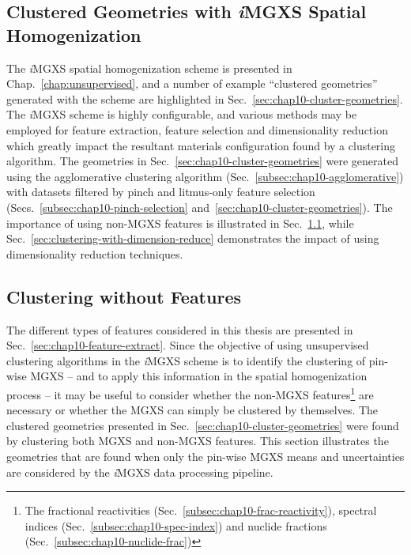 \begin{appendices}
\clearpage


\chapter{Clustered Geometries with \textit{i}MGXS Spatial Homogenization}
\label{sec:clustered-geometries}

The \textit{i}\ac{MGXS} spatial homogenization scheme is presented in Chap.~\ref{chap:unsupervised}, and a number of example ``clustered geometries'' generated with the scheme are highlighted in Sec.~\ref{sec:chap10-cluster-geometries}. The \textit{i}\ac{MGXS} scheme is highly configurable, and various methods may be employed for feature extraction, feature selection and dimensionality reduction which greatly impact the resultant materials configuration found by a clustering algorithm. The geometries in Sec.~\ref{sec:chap10-cluster-geometries} were generated using the agglomerative clustering algorithm (Sec.~\ref{subsec:chap10-agglomerative}) with datasets filtered by pinch and litmus-only feature selection (Secs.~\ref{subsec:chap10-pinch-selection} and~\ref{sec:chap10-cluster-geometries}). The importance of using non-\ac{MGXS} features is illustrated in Sec.~\ref{sec:clustering-without-features}, while Sec.~\ref{sec:clustering-with-dimension-reduce} demonstrates the impact of using dimensionality reduction techniques.


\section{Clustering without Features}
\label{sec:clustering-without-features}

The different types of features considered in this thesis are presented in Sec.~\ref{sec:chap10-feature-extract}. Since the objective of using unsupervised clustering algorithms in the \textit{i}\ac{MGXS} scheme is to identify the clustering of pin-wise \ac{MGXS} -- and to apply this information in the spatial homogenization process -- it may be useful to consider whether the non-\ac{MGXS} features\footnote{The fractional reactivities (Sec.~\ref{subsec:chap10-frac-reactivity}), spectral indices (Sec.~\ref{subsec:chap10-spec-index}) and nuclide fractions (Sec.~\ref{subsec:chap10-nuclide-frac})} are necessary or whether the \ac{MGXS} can simply be clustered by themselves. The clustered geometries presented in Sec.~\ref{sec:chap10-cluster-geometries} were found by clustering both \ac{MGXS} and non-\ac{MGXS} features. This section illustrates the geometries that are found when only the pin-wise \ac{MGXS} means and uncertainties are considered by the \textit{i}\ac{MGXS} data processing pipeline.


\end{appendices}
